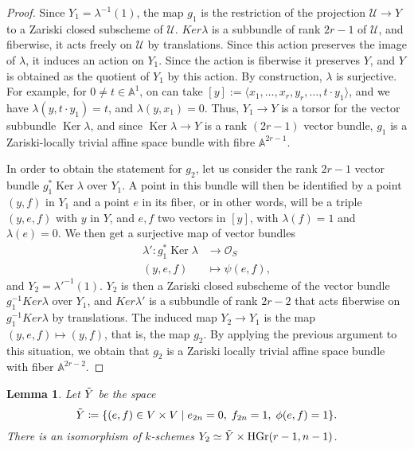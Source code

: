 \documentclass[10pt]{amsart}
\theoremstyle{definition}
\theoremstyle{plain}
\newtheorem{lemma}[defn]{Lemma}
\numberwithin{equation}{section}
\newcommand{\0}{\emptyset}
\newcommand{\A}{{\mathbb A}}
\newcommand{\HGr}{{\operatorname{HGr}}}
\newcommand{\Ker}{{\operatorname{Ker}}}
\begin{document}
\begin{proof}
Since $Y_1=\lambda^{-1}(1)$, the map $g_1$ is the restriction of the projection $\mathcal{U}\to Y$ to a Zariski closed subscheme of $\mathcal{U}. $ $Ker\lambda$ is a subbundle of rank $2r-1$ of $\mathcal{U}$, and fiberwise, it acts freely on $\mathcal{U}$ by translations. Since this action preserves the image of $\lambda$, it induces an action on $Y_1$. Since the action is fiberwise it preserves $Y$, and $Y$ is obtained as the quotient of $Y_1$ by this action. By construction, $\lambda$ is surjective. For example, for $0 \neq t \in \A^1$, on can take $[y]:= \langle x_1, \ldots, x_r,y_r,\ldots, t \cdot y_1 \rangle$, and we have $\lambda(y, t \cdot y_1)=t$, and $\lambda(y,x_1)=0$. Thus, $Y_1 \to Y$ is a torsor for the vector subbundle $\Ker\lambda$, and since $\Ker\lambda \to Y$ is a rank $(2r-1)$ vector bundle, $g_1$  is a Zariski-locally trivial affine space bundle with fibre $\mathbb{A}^{2r-1}$.

In order to obtain the statement for $g_2$, let us consider the rank $2r-1$ vector bundle $g_1^*\Ker\lambda$ over $Y_1$. A point in this bundle will then be identified by a point $(y,f)$ in $Y_1$ and a point $e$ in its fiber, or in other words, will be a triple $(y,e,f)$ with $y$ in $Y$, and $e,f$ two vectors in $[y]$, with $\lambda(f)=1$ and $\lambda(e)=0$. We then get a surjective map of vector bundles 
\begin{align*}
    \lambda':g_1^*\Ker\lambda & \to \mathcal{O}_S\\
    (y,e,f) &\mapsto \psi(e,f),
\end{align*}
and $Y_2=\lambda'^{-1}(1)$. $Y_2$ is then a Zariski closed subscheme of the vector bundle $g_1^{-1}Ker\lambda$ over $Y_1$, and $Ker\lambda'$ is a subbundle of rank $2r-2$ that acts fiberwise on $g_1^{-1}Ker\lambda$ by translations. The induced map $Y_2 \to Y_1$ is the map $(y,e,f) \mapsto (y,f)$, that is, the map $g_2$. By applying the previous argument to this situation, we obtain that $g_2$ is a Zariski locally trivial affine space bundle with fiber $\mathbb{A}^{2r-2}$. 
\end{proof}

\begin{lemma}
\label{lemma:smallerGrassmannian}
    Let $\Tilde{Y}$ be the space
    $$\Tilde{Y} \coloneqq\{(e,f)\in V \times V \mid e_{2n}=0, \; f_{2n}=1, \; \phi (e,f)=1\}.$$
    There is an isomorphism of $k$-schemes $Y_2 \simeq \Tilde{Y}\times \HGr(r-1,n-1)$.
\end{lemma}
\end{document}
